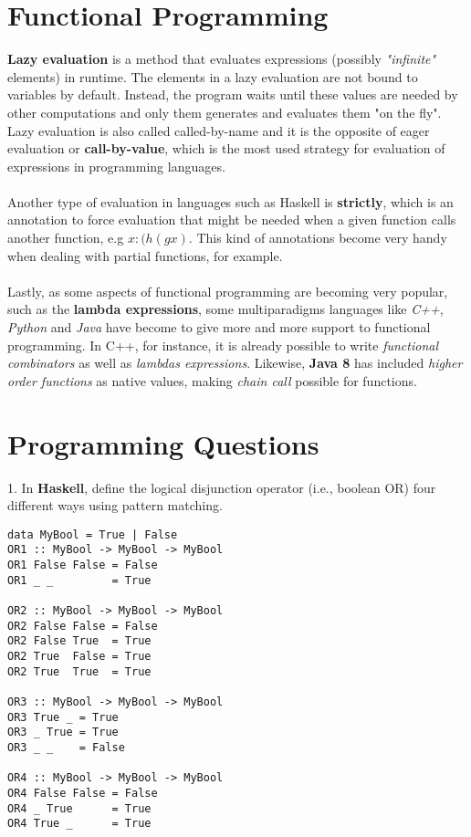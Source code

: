 \documentclass[conference]{IEEEtran}
\begin{document}
\section{Functional Programming}
\textbf{Lazy evaluation} is a method that evaluates expressions (possibly \textit{"infinite"} elements) in runtime. The elements in a lazy evaluation are not bound to variables by default. Instead, the program waits until these values are needed by other computations and only them generates and evaluates them "on the fly". Lazy evaluation is also called called-by-name and it is the opposite of eager evaluation or \textbf{call-by-value}, which is the most used strategy for evaluation of expressions in programming languages.
\\\\
Another type of evaluation in languages such as Haskell is \textbf{strictly}, which is an annotation to force evaluation that might be needed when a given function calls another function, e.g $x:(h (g x)$. This kind of annotations become very handy when dealing with partial functions, for example.
\\\\
Lastly, as some aspects of functional programming are becoming very popular, such as the \textbf{lambda expressions}, some multiparadigms languages like \textit{C++}, \textit{Python} and \textit{Java} have become to give more and more support to functional programming. In C++, for instance, it is already possible to write \textit{functional combinators} as well as \textit{lambdas expressions}. Likewise, \textbf{Java 8} has included \textit{higher order functions} as native values, making \textit{chain call} possible for functions.
\newpage  
\section{Programming Questions}
1. In \textbf{Haskell}, define the logical disjunction operator (i.e., boolean OR) four different ways using pattern matching.
\lstset{language=Haskell}
\begin{lstlisting}[frame=single]
data MyBool = True | False
OR1 :: MyBool -> MyBool -> MyBool
OR1 False False = False
OR1 _ _         = True

OR2 :: MyBool -> MyBool -> MyBool
OR2 False False = False
OR2 False True  = True
OR2 True  False = True
OR2 True  True  = True

OR3 :: MyBool -> MyBool -> MyBool
OR3 True _ = True
OR3 _ True = True
OR3 _ _    = False

OR4 :: MyBool -> MyBool -> MyBool
OR4 False False = False
OR4 _ True      = True
OR4 True _      = True
\end{lstlisting}
\end{document}
